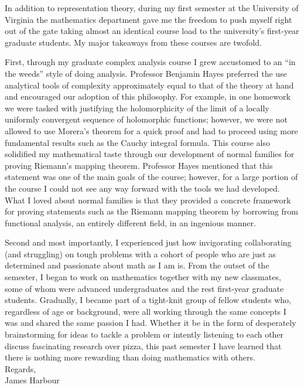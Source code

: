\documentclass[11pt]{article}
\begin{document}
In addition to representation theory, during my first semester at the University of Virginia the mathematics department gave me the freedom to push myself right out of the gate taking almost an identical course load to the university's first-year graduate students. My major takeaways from these courses are twofold.

First, through my graduate complex analysis course I grew accustomed to an ``in the weeds'' style of doing analysis. Professor Benjamin Hayes preferred the use analytical tools of complexity approximately equal to that of the theory at hand and encouraged our adoption of this philosophy. For example, in one homework we were tasked with justifying the holomorphicity of the limit of a locally uniformly convergent sequence of holomorphic functions; however, we were not allowed to use Morera's theorem for a quick proof and had to proceed using more fundamental results such as the Cauchy integral formula. This course also solidified my mathematical taste through our development of normal families for proving Riemann's mapping theorem. Professor Hayes mentioned that this statement was one of the main goals of the course; however, for a large portion of the course I could not see any way forward with the tools we had developed. What I loved about normal families is that they provided a concrete framework for proving statements such as the Riemann mapping theorem by borrowing from functional analysis, an entirely different field, in an ingenious manner.


Second and most importantly, I experienced just how invigorating collaborating (and struggling) on tough problems with a cohort of people who are just as determined and passionate about math as I am is. From the outset of the semester, I began to work on mathematics together with my new classmates, some of whom were advanced undergraduates and the rest first-year graduate students. Gradually, I became part of a tight-knit group of fellow students who, regardless of age or background, were all working through the same concepts I was and shared the same passion I had. Whether it be in the form of desperately brainstorming for ideas to tackle a problem or intently listening to each other discuss fascinating research over pizza, this past semester I have learned that there is nothing more rewarding than doing mathematics with others.\\

\vspace{0.5cm}
\noindent Regards,\\

\noindent James Harbour
\end{document}
